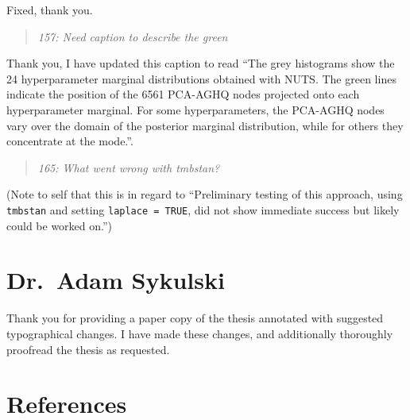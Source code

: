 \documentclass[
  12pt,
]{article}
\begin{document}
Fixed, thank you.

\begin{quote}
\emph{157: Need caption to describe the green}
\end{quote}

Thank you, I have updated this caption to read ``The grey histograms
show the 24 hyperparameter marginal distributions obtained with NUTS.
The green lines indicate the position of the 6561 PCA-AGHQ nodes
projected onto each hyperparameter marginal. For some hyperparameters,
the PCA-AGHQ nodes vary over the domain of the posterior marginal
distribution, while for others they concentrate at the mode.''.

\begin{quote}
\emph{165: What went wrong with tmbstan?}
\end{quote}

(Note to self that this is in regard to ``Preliminary testing of this
approach, using \texttt{tmbstan} and setting \texttt{laplace\ =\ TRUE},
did not show immediate success but likely could be worked on.'')

\newpage

\section{Dr.~Adam Sykulski}\label{dr.-adam-sykulski}

Thank you for providing a paper copy of the thesis annotated with
suggested typographical changes. I have made these changes, and
additionally thoroughly proofread the thesis as requested.

\newpage

\section*{References}\label{references}
\end{document}
